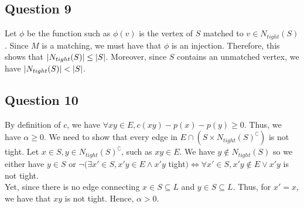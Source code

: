 \documentclass{cours}
\begin{document}
\subsection{Question 9}
Let $\phi$ be the function such as $\phi(v)$ is the vertex of $S$ matched to $v \in N_{tight}(S)$. Since $M$ is a matching, we must have that $\phi$ is an injection. Therefore, this shows that $\left|N_{tight}(S)\right| \leq \left|S\right|$. Moreover, since $S$ contains an unmatched vertex, we have $\left|N_{tight}(S)\right| < \left|S\right|$.

\subsection{Question 10}
By definition of $c$, we have $\forall xy \in E, c(xy) - p(x) - p(y) \geq 0$. Thus, we have $\alpha \geq 0$. We need to show that every edge in $E \cap \left(S \times N_{tight}(S)^{\complement}\right)$ is not tight. Let $x \in S, y \in N_{tight}(S)^{\complement}$, such as $xy \in E$. We have $y \notin N_{tight}(S)$ so we either have $y \in S$ or $\lnot(\exists x' \in S, x'y \in E \land x'y$ tight$) \Leftrightarrow \forall x' \in S, x'y \notin E \lor x'y$ is not tight. \\
Yet, since there is no edge connecting $x \in S \subseteq L$ and $y \in S \subseteq L$. Thus, for $x' = x$, we have that $xy$ is not tight. Hence, $\alpha > 0$. 
\end{document}

